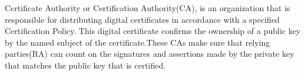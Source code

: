Certificate Authority or  Certification Authority(CA), is an organization that is responsible for distributing digital certificates in accordance with a specified Certification Policy. This digital certificate confirms the ownership of a public key by the named subject of the certificate.These CAs make sure that relying parties(RA) can count on  the signatures and assertions made by the private key that matches the public key that is certified.